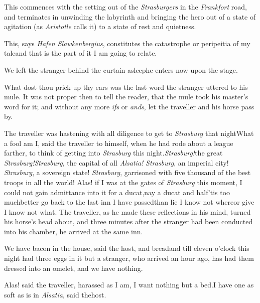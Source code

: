 \documentclass{article}
\begin{document}
This commences with the setting out of the \textit{Strasburgers}
in the \textit{Frankfort} road, and terminates in unwinding the
laby\-rinth and bringing the hero out of a state of agitation (as
\textit{Aristotle} calls it) to a state of rest and quietness.

This, says \textit{Hafen Slawkenbergius}, constitutes the
catastrophe or peripeitia of my tale\tsk and that
is the part of it I am going to relate.

We left the stranger behind the curtain asleep\tsk he
enters now upon the stage.

\tsk What dost thou prick up thy ears \break
\tsk was the last word the stranger uttered
to his mule. It was not proper then to\break
tell the reader, that the mule took his\break
master’s word for it; and without any\break
more \textit{ifs} or \textit{ands}, let the
traveller and his horse pass by.

The traveller was hastening with all diligence to get to
\textit{Strasburg} that night\break\tsk What a fool am I, said the
traveller to himself, when he had rode about a league farther,
to think of getting into \textit{Strasburg} this
night.\tsk \textit{Strasburg!}\tsk the great
\textit{Strasburg!}\tsk \textit{Strasburg}, the capital of all
\textit{Alsatia!} \textit{Strasburg}, an imperial city!
\textit{Strasburg}, a sovereign state! \textit{Strasburg}, garrisoned
with five thousand of the best troops in all the world!\tsk
Alas!\break
if I was at the gates of \textit{Strasburg} this moment, I could not
gain admittance into it for a ducat,\tsk nay a ducat and
half\tsk ’tis too much\tsk better go back to the last inn
I have passed\tsk than lie I know not
where\tsk or give I know not what. The traveller, as he
made these reflections in his mind, turned his horse’s head
about, and three minutes after the stranger had been conducted into
his chamber, he arrived at the same inn.

\tsk We have bacon in the house, said the host, and
bread\tsh and till eleven o’clock this night had
three eggs in it\tsk{}
but a stranger, who arrived an hour
ago, has had them dressed into an omelet, and we have
nothing.\tsh

\tsk Alas! said the traveller, harassed as I am, I want nothing but a
bed.\tsh I have one as soft as is in \textit{Alsatia}, said
the\break host.
\end{document}
